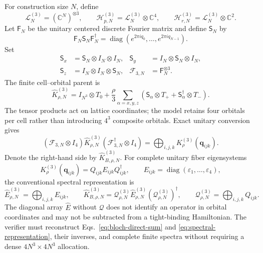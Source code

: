 \documentclass[11pt]{article}
\begin{document}
For construction size $N$, define
\begin{equation}
 \mathcal L_N^{(3)}=(\mathbb C^N)^{\otimes3},\qquad
 \mathcal H_{p,N}^{(3)}=\mathcal L_N^{(3)}\otimes\mathbb C^4,\qquad
 \mathcal H_{r,N}^{(3)}=\mathcal L_N^{(3)}\otimes\mathbb C^2.
 \label{eq:spaces}
\end{equation}
Let $\mathsf F_N$ be the unitary centered discrete Fourier matrix and define
$\mathsf S_N$ by
\begin{equation}
 \mathsf F_N\mathsf S_N\mathsf F_N^\dagger
 =\operatorname{diag}\left(e^{2\pi iq_0},\ldots,e^{2\pi iq_{N-1}}\right).
\end{equation}
Set
\begin{align}
 \mathsf S_x&=\mathsf S_N\otimes I_N\otimes I_N,&
 \mathsf S_y&=I_N\otimes\mathsf S_N\otimes I_N,\\
 \mathsf S_z&=I_N\otimes I_N\otimes\mathsf S_N,&
 \mathcal F_{3,N}&=\mathsf F_N^{\otimes3}.
\end{align}
The finite cell--orbital parent is
\begin{equation}
 \widehat K_{\rho,N}^{(3)}
 =I_{N^3}\otimes T_0
 +\frac\rho3\sum_{\alpha=x,y,z}
 \left(\mathsf S_\alpha\otimes T_+
 +\mathsf S_\alpha^\dagger\otimes T_-\right).
 \label{eq:kronecker-parent}
\end{equation}
The tensor products act on lattice coordinates; the model retains four orbitals per
cell rather than introducing $4^3$ composite orbitals. Exact unitary conversion gives
\begin{equation}
 (\mathcal F_{3,N}\otimes I_4)\widehat K_{\rho,N}^{(3)}
 (\mathcal F_{3,N}^\dagger\otimes I_4)
 =\bigoplus_{i,j,k}K_\rho^{(3)}(\mathbf q_{ijk}).
 \label{eq:bloch-direct-sum}
\end{equation}
Denote the right-hand side by $\widehat K_{B,\rho,N}^{(3)}$. For complete unitary
fiber eigensystems
\begin{equation}
 K_\rho^{(3)}(\mathbf q_{ijk})
 =Q_{ijk}E_{ijk}Q_{ijk}^\dagger,
 \qquad E_{ijk}=\operatorname{diag}(\varepsilon_1,\ldots,\varepsilon_4),
\end{equation}
the conventional spectral representation is
\begin{equation}
 \widehat E_{\rho,N}^{(3)}=\bigoplus_{i,j,k}E_{ijk},
 \qquad
 \widehat K_{B,\rho,N}^{(3)}
 =\mathcal Q_{\rho,N}^{(3)}\widehat E_{\rho,N}^{(3)}
  (\mathcal Q_{\rho,N}^{(3)})^\dagger,
 \qquad \mathcal Q_{\rho,N}^{(3)}=\bigoplus_{i,j,k}Q_{ijk}.
 \label{eq:spectral-representation}
\end{equation}
The diagonal array $\widehat E$ without $\mathcal Q$ does not identify an operator in
orbital coordinates and may not be subtracted from a tight-binding Hamiltonian. The
verifier must reconstruct Eqs.~\eqref{eq:bloch-direct-sum} and
\eqref{eq:spectral-representation}, their inverses, and complete finite spectra without
requiring a dense $4N^3\times4N^3$ allocation.
\end{document}
